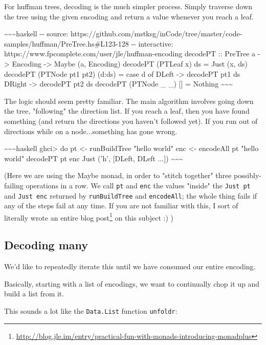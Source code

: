\documentclass[]{article}
\renewcommand{\href}[2]{#2\footnote{\url{#1}}}
\begin{document}
For huffman trees, decoding is the much simpler process. Simply traverse down
the tree using the given encoding and return a value whenever you reach a leaf.

\textasciitilde{}\textasciitilde{}\textasciitilde{}haskell -\/- source:
https://github.com/mstksg/inCode/tree/master/code-samples/huffman/PreTree.hs\#L123-128
-\/- interactive: https://www.fpcomplete.com/user/jle/huffman-encoding decodePT
:: PreTree a -\textgreater{} Encoding -\textgreater{} Maybe (a, Encoding)
decodePT (PTLeaf x) ds = Just (x, ds) decodePT (PTNode pt1 pt2) (d:ds) = case d
of DLeft -\textgreater{} decodePT pt1 ds DRight -\textgreater{} decodePT pt2 ds
decodePT (PTNode \_ \_) {[}{]} = Nothing
\textasciitilde{}\textasciitilde{}\textasciitilde{}

The logic should seem pretty familiar. The main algorithm involves going down
the tree, "following" the direction list. If you reach a leaf, then you have
found something (and return the directions you haven't followed yet). If you run
out of directions while on a node...something has gone wrong.

\textasciitilde{}\textasciitilde{}\textasciitilde{}haskell ghci\textgreater{} do
pt \textless{}- runBuildTree "hello world" \textbar{} enc \textless{}- encodeAll
pt "hello world" \textbar{} decodePT pt enc Just ('h', {[}DLeft, DLeft ...{]})
\textasciitilde{}\textasciitilde{}\textasciitilde{}

(Here we are using the Maybe monad, in order to "stitch together" three
possibly-failing operations in a row. We call \texttt{pt} and \texttt{enc} the
values "inside" the \texttt{Just\ pt} and \texttt{Just\ enc} returned by
\texttt{runBuildTree} and \texttt{encodeAll}; the whole thing fails if any of
the steps fail at any time. If you are not familiar with this,
\href{http://blog.jle.im/entry/practical-fun-with-monads-introducing-monadplus}{I
sort of literally wrote an entire blog post} on this subject :) )

\subsection{Decoding many}

We'd like to repeatedly iterate this until we have consumed our entire encoding.

Basically, starting with a list of encodings, we want to continually chop it up
and build a list from it.

This sounds a lot like the \texttt{Data.List} function \texttt{unfoldr}:
\end{document}
